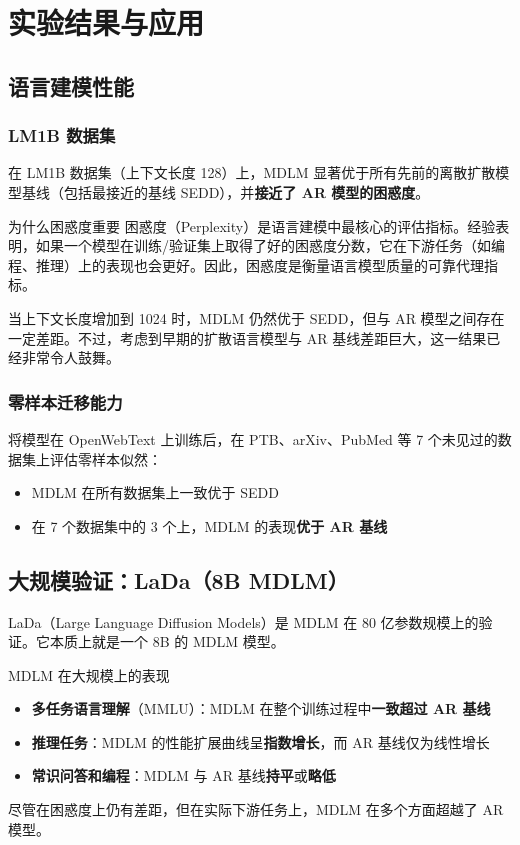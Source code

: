 \section{实验结果与应用}

\subsection{语言建模性能}

\subsubsection{LM1B 数据集}

在 LM1B 数据集（上下文长度 128）上，MDLM 显著优于所有先前的离散扩散模型基线（包括最接近的基线 SEDD），并\textbf{接近了 AR 模型的困惑度}。

\begin{knowledgebox}{为什么困惑度重要}
困惑度（Perplexity）是语言建模中最核心的评估指标。经验表明，如果一个模型在训练/验证集上取得了好的困惑度分数，它在下游任务（如编程、推理）上的表现也会更好。因此，困惑度是衡量语言模型质量的可靠代理指标。
\end{knowledgebox}

当上下文长度增加到 1024 时，MDLM 仍然优于 SEDD，但与 AR 模型之间存在一定差距。不过，考虑到早期的扩散语言模型与 AR 基线差距巨大，这一结果已经非常令人鼓舞。

\subsubsection{零样本迁移能力}

将模型在 OpenWebText 上训练后，在 PTB、arXiv、PubMed 等 7 个未见过的数据集上评估零样本似然：
\begin{itemize}
    \item MDLM 在所有数据集上一致优于 SEDD
    \item 在 7 个数据集中的 3 个上，MDLM 的表现\textbf{优于 AR 基线}
\end{itemize}

\subsection{大规模验证：LaDa（8B MDLM）}

LaDa（Large Language Diffusion Models）是 MDLM 在 80 亿参数规模上的验证。它本质上就是一个 8B 的 MDLM 模型。

\begin{importantbox}{MDLM 在大规模上的表现}
\begin{itemize}
    \item \textbf{多任务语言理解}（MMLU）：MDLM 在整个训练过程中\textbf{一致超过 AR 基线}
    \item \textbf{推理任务}：MDLM 的性能扩展曲线呈\textbf{指数增长}，而 AR 基线仅为线性增长
    \item \textbf{常识问答和编程}：MDLM 与 AR 基线\textbf{持平}或\textbf{略低}
\end{itemize}
尽管在困惑度上仍有差距，但在实际下游任务上，MDLM 在多个方面超越了 AR 模型。
\end{importantbox}

